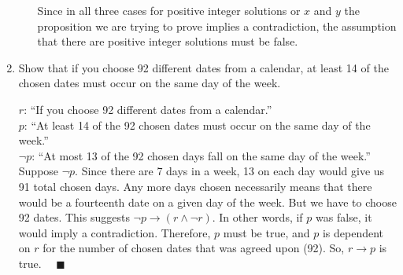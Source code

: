 \documentclass[letterpaper, 12pt]{article}
\newcommand{\qed}{\quad \blacksquare}
\newcommand{\then}{\rightarrow}
\begin{document}
\begin{enumerate}
\begin{enumerate}
\begin{flushleft}
    Since in all three cases for positive integer solutions or $x$ and $y$ the proposition we 
    are trying to prove implies a contradiction, the assumption that there are positive integer 
    solutions must be false.
\end{flushleft}
\end{enumerate}
\item Show that if you choose 92 different dates from a calendar, at least 14 of the chosen 
dates must occur on the same day of the week.
\begin{flushleft}
    $r$: ``If you choose 92 different dates from a calendar.'' \\
    $p$: ``At least 14 of the 92 chosen dates must occur on the same day of the week.'' \\
    $\neg p$: ``At most 13 of the 92 chosen days fall on the same day of the week.'' \\
    Suppose $\neg p$. Since there are 7 days in a week, 13 on each day would give us 91 total 
    chosen days. Any more days chosen necessarily means that there would be a fourteenth date 
    on a given day of the week. But we have to choose 92 dates. This suggests 
    $\neg p \then (r \wedge \neg r)$. In other words, if $p$ was false, it would imply 
    a contradiction. Therefore, $p$ must be true, and $p$ is dependent on $r$ for the number of 
    chosen dates that was agreed upon (92). So, $r \then p$ is true. $\qed$
\end{flushleft}
\end{enumerate}
\end{document}
